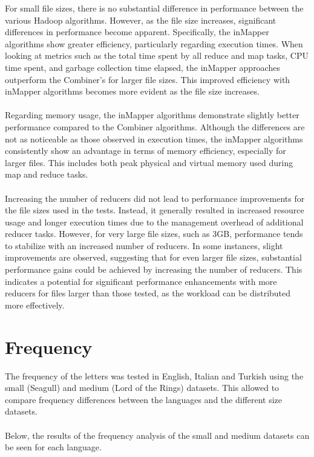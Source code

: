For small file sizes, there is no substantial difference in performance between the various Hadoop algorithms. However,
as the file size increases, significant differences in performance become apparent. Specifically, the inMapper algorithms
show greater efficiency, particularly regarding execution times. When looking at metrics such as the total time spent by
all reduce and map tasks, CPU time spent, and garbage collection time elapsed, the inMapper approaches outperform the
Combiner's for larger file sizes. This improved efficiency with inMapper algorithms becomes more evident
as the file size increases.\\ \\
Regarding memory usage, the inMapper algorithms demonstrate slightly better performance compared to the Combiner algorithms.
Although the differences are not as noticeable as those observed in execution times, the inMapper algorithms consistently
show an advantage in terms of memory efficiency, especially for larger files. This includes both peak physical and virtual
memory used during map and reduce tasks.\\ \\
Increasing the number of reducers did not lead to performance improvements for the file sizes used in the tests. Instead,
it generally resulted in increased resource usage and longer execution times due to the management overhead of additional reducer tasks.
However, for very large file sizes, such as 3GB, performance tends to stabilize with an increased number of reducers.
In some instances, slight improvements are observed, suggesting that for even larger file sizes, substantial performance gains could be achieved
by increasing the number of reducers. This indicates a potential for significant performance enhancements with more reducers for files
larger than those tested, as the workload can be distributed more effectively.

\newpage

\section{Frequency}
The frequency of the letters was tested in English, Italian and Turkish using the small (Seagull) and medium (Lord of the Rings) datasets. 
This allowed to compare frequency differences between the languages and the different size datasets.\\ \\
Below, the results of the frequency analysis of the small and medium datasets can be seen for each language.

